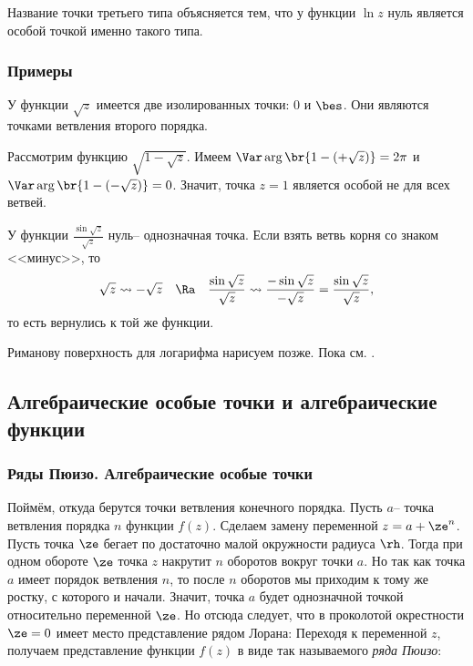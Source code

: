 \documentclass[a4paper]{article}
\begin{document}
Название точки третьего типа объясняется тем, что у функции $\ln z$ нуль является особой точкой именно такого типа.

\subsubsection{Примеры}

\begin{ex}
У функции $\sqrt{z}$ имеется две изолированных точки: $0$ и $\bes$. Они являются точками ветвления второго порядка.
\end{ex}

\begin{ex}
Рассмотрим функцию $\sqrt{1-\sqrt{z}}$.
Имеем $\Var\arg \br{1- (+\sqrt z)}=2\pi$ и $\Var\arg \br{1-(-\sqrt z)}=0$. Значит, точка $z=1$ является особой
не для всех ветвей.
\end{ex}

\begin{ex} У функции $\frac{\sin\sqrt{z}}{\sqrt{z}}$ нуль-- однозначная точка. Если взять ветвь корня со знаком <<минус>>, то
$$\sqrt{z} \rightsquigarrow -\sqrt{z} \quad \Ra \quad
\frac{\sin\sqrt{z}}{\sqrt{z}} \rightsquigarrow \frac{-\sin\sqrt z }{-\sqrt z}=\frac{\sin\sqrt z}{\sqrt z},$$
то есть вернулись к той же функции.
\end{ex}

\begin{petit}
Риманову поверхность для логарифма нарисуем позже. Пока см. \cite[стр. 195]{shabat}.
\end{petit}

\subsection{Алгебраические особые точки и алгебраические функции}

\subsubsection{Ряды Пюизо. Алгебраические особые точки}

Поймём, откуда берутся точки ветвления конечного порядка.
Пусть $a$-- точка ветвления порядка $n$ функции $f(z)$. Сделаем замену переменной
$z = a + \ze^n$. Пусть точка $\ze$ бегает по достаточно малой окружности радиуса $\rh$.
Тогда при одном обороте $\ze$ точка $z$ накрутит $n$ оборотов вокруг точки $a$.
Но так как точка $a$ имеет порядок ветвления $n$, то после $n$ оборотов мы приходим к тому же
ростку, с которого и начали. Значит, точка $a$ будет однозначной точкой относительно переменной
$\ze$. Но отсюда следует, что в проколотой окрестности $\ze = 0$ имеет место представление рядом Лорана:
Переходя к переменной $z$, получаем представление функции $f(z)$ в виде так называемого \emph{ряда Пюизо}:
\end{document}
